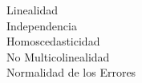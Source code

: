 \documentclass[preview]{standalone}
\begin{document}
Linealidad\\Independencia\\Homoscedasticidad\\No Multicolinealidad\\Normalidad de los Errores\\
\end{document}
